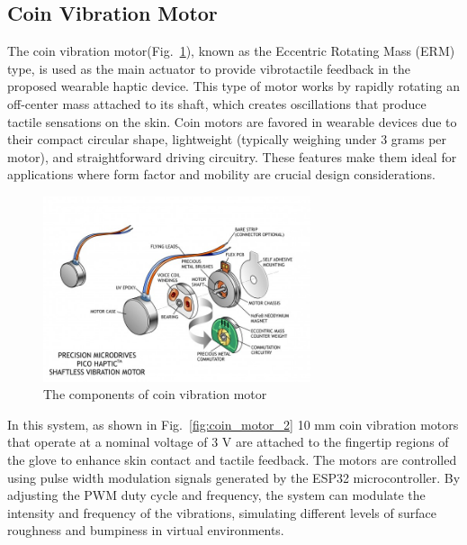 \newpage
\subsection{Coin Vibration Motor}
The coin vibration motor(Fig.~\ref{fig:coin_motor}), known as the Eccentric Rotating Mass (ERM) type, is used as the main actuator to provide vibrotactile feedback in the proposed wearable haptic device. This type of motor works by rapidly rotating an off-center mass attached to its shaft, which creates oscillations that produce tactile sensations on the skin. Coin motors are favored in wearable devices due to their compact circular shape, lightweight (typically weighing under 3 grams per motor), and straightforward driving circuitry. These features make them ideal for applications where form factor and mobility are crucial design considerations\cite{coin_motor}.

\begin{figure}[H]\centering
	\includegraphics[width=0.7\textwidth]{Pictures/coin_motor.jpg}%
	\caption{The components of coin vibration motor\cite{coin_motor}}\label{fig:coin_motor}%
\end{figure}

In this system, as shown in Fig.~\ref{fig:coin_motor_2} 10 mm coin vibration motors that operate at a nominal voltage of 3 V are attached to the fingertip regions of the glove to enhance skin contact and tactile feedback. The motors are controlled using pulse width modulation signals generated by the ESP32 microcontroller. By adjusting the PWM duty cycle and frequency, the system can modulate the intensity and frequency of the vibrations, simulating different levels of surface roughness and bumpiness in virtual environments.

